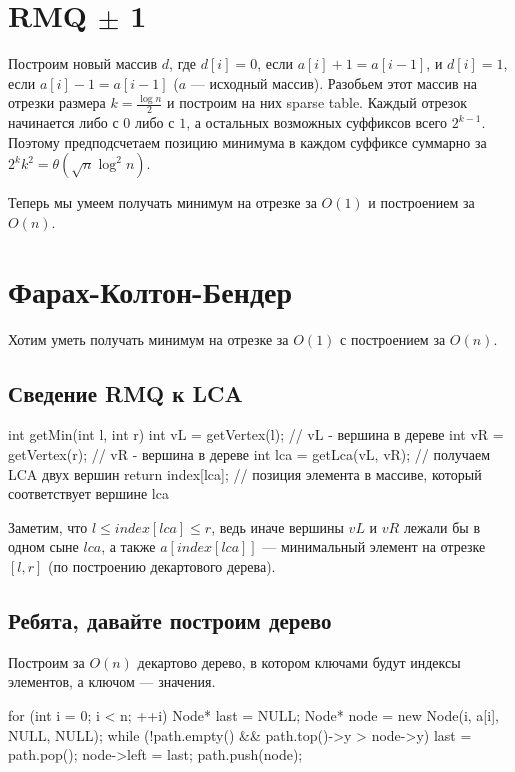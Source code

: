 \section[RMQ +- 1]{RMQ $\pm$ 1}
Построим новый массив $d$, где $d[i] = 0$, если $a[i] + 1 = a[i - 1]$, и $d[i] = 1$, если $a[i] - 1 = a[i - 1]$ ($a$ --- исходный массив).
Разобьем этот массив на отрезки размера $k = \frac{\log n}{2}$ и построим на них sparse table.
Каждый отрезок начинается либо с $0$ либо с $1$, а остальных возможных суффиксов всего $2^{k-1}$. Поэтому предподсчетаем 
позицию минимума в каждом суффиксе суммарно за $2^k k^2 = \theta(\sqrt{n} \log^2 n)$.

Теперь мы умеем получать минимум на отрезке за $O(1)$ и построением за $O(n)$.

\section{Фарах-Колтон-Бендер}
Хотим уметь получать минимум на отрезке за $O(1)$ с построением за $O(n)$.

\subsection{Сведение RMQ к LCA}
\begin{cppcode}
int getMin(int l, int r) {
	int vL = getVertex(l); // vL - вершина в дереве
	int vR = getVertex(r); // vR - вершина в дереве
	int lca = getLca(vL, vR); // получаем LCA двух вершин
	return index[lca]; // позиция элемента в массиве, который соответствует вершине lca
}
\end{cppcode}

Заметим, что $l \le index[lca] \le r$, ведь иначе вершины $vL$ и $vR$ лежали бы в одном сыне $lca$,
а также $a[index[lca]]$ --- минимальный элемент на отрезке $[l, r]$ (по построению декартового дерева).

\subsection{Ребята, давайте построим дерево}
Построим за $O(n)$ декартово дерево, в котором ключами будут индексы элементов, а ключом --- значения.

\begin{cppcode}
for (int i = 0; i < n; ++i) {
	Node* last = NULL;
	Node* node = new Node(i, a[i], NULL, NULL);
	while (!path.empty() && path.top()->y > node->y)
		last = path.pop();
	node->left = last;
	path.push(node);
}
\end{cppcode}

